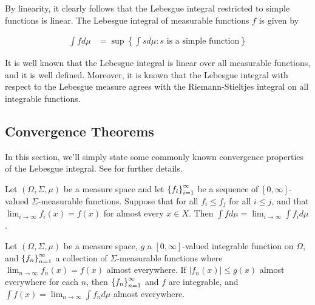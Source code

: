 By linearity, it clearly follows that the Lebesgue integral restricted
to simple functions is linear. The Lebesgue integral of measurable
functions $f$ is given by

\begin{align*}
  \int fd\mu &= \sup\left\{\int sd\mu : s\text{ is a simple function}\right\}
\end{align*}

It is well known that the Lebesgue integral is linear over all
measurable functions, and it is well defined. Moreover, it is known
that the Lebesgue integral with respect to the Lebesgue measure agrees
with the Riemann-Stieltjes integral on all integrable functions.

\subsection{Convergence
  Theorems}\label{s:app:measure:integration:convergence}
In this section, we'll simply state some commonly known convergence
properties of the Lebesgue integral. See \citet{cohn2013measure} for
further details.

\begin{theorem}\label{thm:monotone-convergence}
  Let $(\Omega, \Sigma, \mu)$ be a measure space and let
  $\indexedint{i}{\infty}{f}$ be a sequence of $[0,\infty]$-valued
  $\Sigma$-measurable functions. Suppose that for all $f_i\leq f_j$
  for all $i\leq j$, and that $\lim_{i\to\infty}f_i(x) = f(x)$ for
  almost every $x\in X$. Then $\int fd\mu = \lim_{i\to\infty}\int f_id\mu$.
\end{theorem}

\begin{theorem}\label{thm:dominated-convergence}
  Let $(\Omega, \Sigma, \mu)$ be a measure space, $g$ a
  $[0,\infty]$-valued integrable function on $\Omega$, and
  $\indexedint{n}{\infty}{f}$ a collection of $\Sigma$-measurable
  functions where $\lim_{n\to\infty}f_n(x) = f(x)$ almost
  everywhere. If $|f_n(x)|\leq g(x)$ almost everywhere for each $n$,
  then $\indexedint{n}{\infty}{f}$ and $f$ are integrable, and $\int f(x) =
  \lim_{n\to\infty}\int f_nd\mu$ almost everywhere.
\end{theorem}
